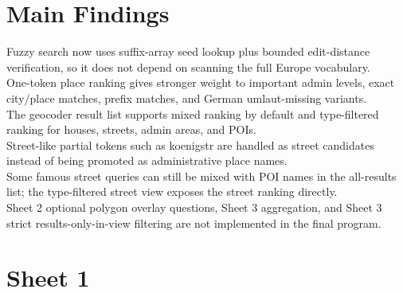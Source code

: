 \documentclass[10pt,a4paper]{article}
\begin{document}
\section*{Main Findings}
\textbullet{} Fuzzy search now uses suffix-array seed lookup plus bounded edit-distance verification, so it does not depend on scanning the full Europe vocabulary.\\
\textbullet{} One-token place ranking gives stronger weight to important admin levels, exact city/place matches, prefix matches, and German umlaut-missing variants.\\
\textbullet{} The geocoder result list supports mixed ranking by default and type-filtered ranking for houses, streets, admin areas, and POIs.\\
\textbullet{} Street-like partial tokens such as koenigstr are handled as street candidates instead of being promoted as administrative place names.\\
\textbullet{} Some famous street queries can still be mixed with POI names in the all-results list; the type-filtered street view exposes the street ranking directly.\\
\textbullet{} Sheet 2 optional polygon overlay questions, Sheet 3 aggregation, and Sheet 3 strict results-only-in-view filtering are not implemented in the final program.\\
\tableofcontents
\clearpage
\section{Sheet 1}
\end{document}
